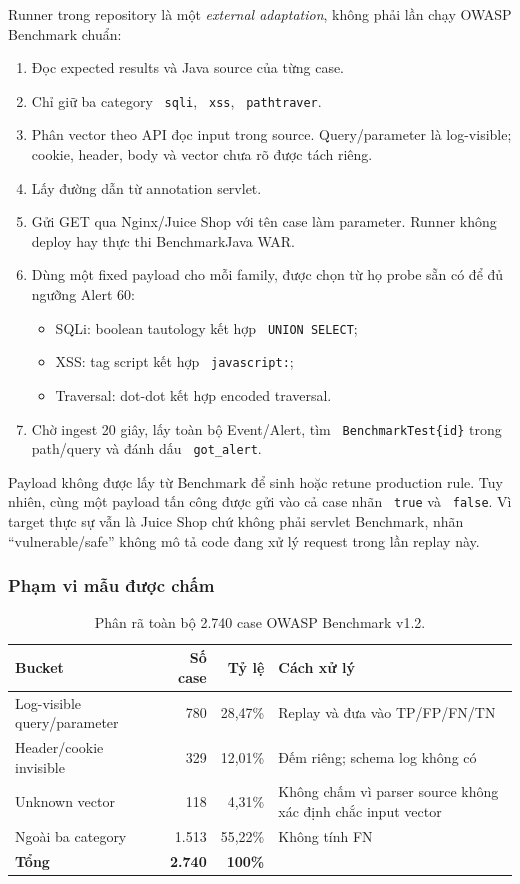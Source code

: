 \documentclass[runningheads]{report-template/llncs}
\newcommand{\code}[1]{\texttt{\small\hyphenchar\font=45 #1}}
\begin{document}
Runner trong repository là một \emph{external adaptation}, không phải
lần chạy OWASP Benchmark chuẩn:
\begin{enumerate}
  \item Đọc expected results và Java source của từng case.
  \item Chỉ giữ ba category \code{sqli}, \code{xss},
  \code{pathtraver}.
  \item Phân vector theo API đọc input trong source. Query/parameter là
  log-visible; cookie, header, body và vector chưa rõ được tách riêng.
  \item Lấy đường dẫn từ annotation servlet.
  \item Gửi GET qua Nginx/Juice Shop với tên case làm parameter. Runner
  không deploy hay thực thi BenchmarkJava WAR.
  \item Dùng một fixed payload cho mỗi family, được chọn từ họ probe sẵn
  có để đủ ngưỡng Alert 60:
  \begin{itemize}
    \item SQLi: boolean tautology kết hợp \code{UNION SELECT};
    \item XSS: tag script kết hợp \code{javascript:};
    \item Traversal: dot-dot kết hợp encoded traversal.
  \end{itemize}
  \item Chờ ingest 20 giây, lấy toàn bộ Event/Alert, tìm
  \code{BenchmarkTest\{id\}} trong path/query và đánh dấu
  \code{got\_alert}.
\end{enumerate}

Payload không được lấy từ Benchmark để sinh hoặc retune production rule.
Tuy nhiên, cùng một payload tấn công được gửi vào cả case nhãn
\code{true} và \code{false}. Vì target thực sự vẫn là Juice Shop chứ
không phải servlet Benchmark, nhãn ``vulnerable/safe'' không mô tả code
đang xử lý request trong lần replay này.

\subsubsection{Phạm vi mẫu được chấm}

\begin{table}
\caption{Phân rã toàn bộ 2.740 case OWASP Benchmark v1.2.}
\label{tab:benchmark-scope}
\centering\small
\begin{tabularx}{\textwidth}{@{}p{34mm}rrY@{}}
\toprule
Bucket & Số case & Tỷ lệ & Cách xử lý\\
\midrule
Log-visible query/parameter & 780 & 28,47\% & Replay và đưa vào
TP/FP/FN/TN\\
Header/cookie invisible & 329 & 12,01\% & Đếm riêng; schema log không có\\
Unknown vector & 118 & 4,31\% & Không chấm vì parser source không xác
định chắc input vector\\
Ngoài ba category & 1.513 & 55,22\% & Không tính FN\\
\textbf{Tổng} & \textbf{2.740} & \textbf{100\%} & \\
\bottomrule
\end{tabularx}
\end{table}
\end{document}
